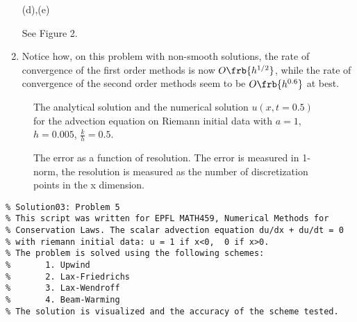 \documentclass{article}
\begin{document}
\begin{exerciseList}
\begin{enumerate}
\item[(d),(e)]
\addtocounter{enumii}{2}
See Figure 2.


\item
Notice how, on this problem with non-smooth solutions, the rate of convergence of the first order methods is now $O\frb{h^{1/2}}$, while the rate of convergence of the second order methods seem to be $O\frb{h^{0.6}}$ at best.
\end{enumerate}





\newpage
\begin{figure}[H] 
\begin{center}
\caption{ The analytical solution and the numerical solution $u(x,t=0.5)$ for the advection equation on Riemann initial data with $a=1$, $h=0.005$, $\frac{k}{h}=0.5$.} 
\end{center}
\end{figure}



\begin{figure}[H] 
\begin{center}
\caption{ The error as a function of resolution. The error is measured in 1-norm, the resolution is measured as the number of discretization points in the x dimension. }
\end{center}
\end{figure}




\newpage



\begin{lstlisting}
% Solution03: Problem 5
% This script was written for EPFL MATH459, Numerical Methods for
% Conservation Laws. The scalar advection equation du/dx + du/dt = 0
% with riemann initial data: u = 1 if x<0,  0 if x>0.
% The problem is solved using the following schemes:
%       1. Upwind
%       2. Lax-Friedrichs
%       3. Lax-Wendroff
%       4. Beam-Warming
% The solution is visualized and the accuracy of the scheme tested.


\end{lstlisting}
\end{exerciseList}
\end{document}
